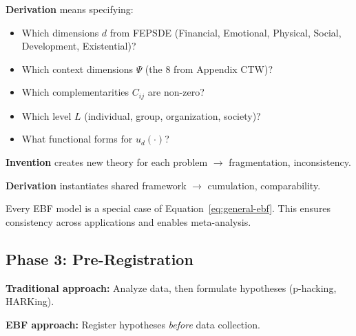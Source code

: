 \textbf{Derivation} means specifying:
\begin{itemize}[nosep]
    \item Which dimensions $d$ from FEPSDE (Financial, Emotional, Physical, Social, Development, Existential)?
    \item Which context dimensions $\Psi$ (the 8 from Appendix CTW)?
    \item Which complementarities $C_{ij}$ are non-zero?
    \item Which level $L$ (individual, group, organization, society)?
    \item What functional forms for $u_d(\cdot)$?
\end{itemize}

\begin{tcolorbox}[colback=green!5!white, colframe=green!75!black,
    title=\textbf{Key Insight: Derivation vs. Invention}]

\textbf{Invention} creates new theory for each problem $\to$ fragmentation, inconsistency.

\textbf{Derivation} instantiates shared framework $\to$ cumulation, comparability.

Every EBF model is a special case of Equation~\ref{eq:general-ebf}. This ensures
consistency across applications and enables meta-analysis.

\end{tcolorbox}

\subsection{Phase 3: Pre-Registration}

\textbf{Traditional approach:} Analyze data, then formulate hypotheses (p-hacking, HARKing).

\textbf{EBF approach:} Register hypotheses \textit{before} data collection.

